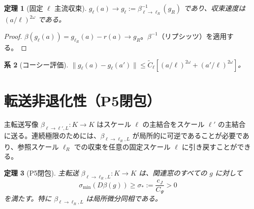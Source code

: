 \documentclass[12pt]{article}
\theoremstyle{plain}
\newtheorem{theorem}{定理}[section]
\newtheorem{corollary}[theorem]{系}
\theoremstyle{definition}
\numberwithin{equation}{section}
\begin{document}
\begin{theorem}[固定 $\ell$ 主流収束]\label{thm:fixedellconv}
$g_\ell(a)\to g_\ell:=\beta_{\ell\to\ell_R}^{-1}(g_R)$ であり、収束速度は $(a/\ell)^{2\omega}$ である。
\end{theorem}

\begin{proof}
$\beta(g_\ell(a))=g_{\ell_R}(a)-r(a)\to g_R$。$\beta^{-1}$（リプシッツ）を適用する。
\end{proof}

\begin{corollary}[コーシー評価]\label{cor:cauchy}
$\|g_\ell(a)-g_\ell(a')\|\leq\widetilde{C}_\ell[(a/\ell)^{2\omega}+(a'/\ell)^{2\omega}]$。
\end{corollary}


\section{転送非退化性（P5閉包）}\label{sec:P5}

主転送写像 $\beta_{\ell\to\ell',L}:K\to K$ はスケール $\ell$ の主結合をスケール $\ell'$ の主結合に送る。連続極限のためには、$\beta_{\ell\to\ell_R,L}$ が局所的に可逆であることが必要であり、参照スケール $\ell_R$ での収束を任意の固定スケール $\ell$ に引き戻すことができる。

\begin{theorem}[P5閉包]\label{thm:P5}
主転送 $\beta_{\ell\to\ell_R,L}:K\to K$ は、関連窓のすべての $g$ に対して
\begin{equation}
\sigma_{\min}(D\beta(g)) \geq \sigma_* := \frac{c_J}{C_\Psi} > 0
\end{equation}
を満たす。特に $\beta_{\ell\to\ell_R,L}$ は局所微分同相である。
\end{theorem}
\end{document}
